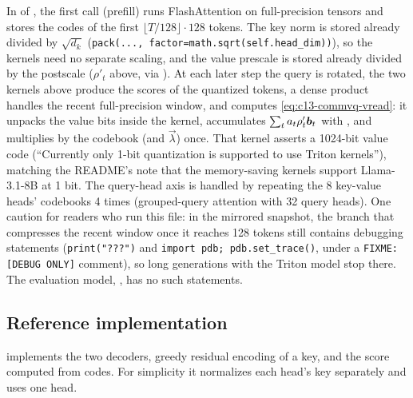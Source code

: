 \begin{implnote}[title={In the code: the decoding attention}]
In  of , the first call (prefill) runs
FlashAttention on full-precision tensors and stores the codes of the first
$\lfloor T/128\rfloor\cdot128$ tokens. The key norm is stored already divided by $\sqrt{d_k}$ (\texttt{pack(..., factor=math.sqrt(self.head\_dim))}),
so the kernels need no separate scaling, and the value prescale is stored already divided by the postscale
($\rho'_t$ above, via ). At each later step the query is rotated, the two kernels
above produce the scores of the quantized tokens, a dense product handles the recent full-precision
window, and  computes \eqref{eq:c13-commvq-vread}: it unpacks the
value bits inside the kernel, accumulates $\sum_ta_t\rho'_t\bm{b}_t$ with , and multiplies by
the codebook (and $\vec{\lambda}$) once. That kernel asserts a 1024-bit value code (``Currently only
1-bit quantization is supported to use Triton kernels''), matching the README's note that the
memory-saving kernels support Llama-3.1-8B at 1 bit. The query-head axis is handled by repeating the
8 key-value heads' codebooks 4 times (grouped-query attention with 32 query heads).
One caution for readers who run this file: in the mirrored snapshot, the branch that compresses the
recent window once it reaches 128 tokens still contains debugging statements (\texttt{print("???")} and
\texttt{import pdb; pdb.set\_trace()}, under a \texttt{FIXME: [DEBUG ONLY]} comment), so long generations
with the Triton model stop there. The evaluation model, , has no such
statements.
\end{implnote}

\subsection{Reference implementation}

 implements the two decoders, greedy residual encoding of a key, and the
score computed from codes. For simplicity it normalizes each head's key separately and uses one head.

